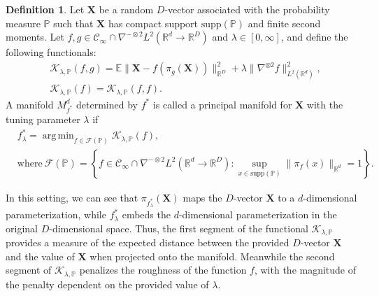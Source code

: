 \documentclass[11pt,reqno]{article}
\DeclareMathOperator*{\argmin}{arg\,min}
\theoremstyle{definition}
\newtheorem{definition}{Definition}
\begin{document}
\begin{definition}
  \label{def:principal_manifolds}
  Let $\boldsymbol{X}$ be a random $D$-vector associated with the probability measure $\mathbb{P}$ such that $\boldsymbol{X}$ has compact support $\text{supp}(\mathbb{P})$ and finite second moments. Let $f, g \in \mathcal{C}_{\infty}\cap \nabla^{-\otimes 2}L^2(\mathbb{R}^{d} \to \mathbb{R}^{D})$ and $\lambda \in [0, \infty]$, and define the following functionals:
  \begin{align}\label{eq:5}
&\mathcal{K}_{\lambda, \mathbb{P}}(f, g) = \mathbb{E}\|\boldsymbol{X} - f(\pi_g(\boldsymbol{X}))\|_{\mathbb{R}^{D}}^2 + \lambda\|\nabla^{\otimes 2}f\|_{L^2(\mathbb{R}^{d})}^2, \\
&\mathcal{K}_{\lambda, \mathbb{P}}(f) = \mathcal{K}_{\lambda, \mathbb{P}}(f, f). \nonumber
  \end{align}
  A manifold $M_{f^{*}}^{d}$ determined by $f^{*}$ is called a principal manifold for $\boldsymbol{X}$ with the tuning parameter $\lambda$ if 
  \begin{equation}\label{eq:7}
    \begin{aligned}
        & f_{\lambda}^{*} = \argmin_{f \in \mathcal{F}(\mathbb{P})}\mathcal{K}_{\lambda, \mathbb{P}}(f), \\ 
    &\text{where} \ \mathcal{F}(\mathbb{P}) = \left\{f \in \mathcal{C}_{\infty} \cap \nabla^{-\otimes 2}L^2(\mathbb{R}^{d} \to \mathbb{R}^{D}): \sup_{x \in \text{supp}(\mathbb{P})}\|\pi_f(x)\|_{\mathbb{R}^{d}} = 1\right\}. 
    \end{aligned}
  \end{equation}
\end{definition}
In this setting, we can see that $\pi_{f_{\lambda}^{*}}(\boldsymbol{X})$ maps the $D$-vector $\boldsymbol{X}$ to a $d$-dimensional parameterization, while $f_{\lambda}^{*}$ embeds the $d$-dimensional parameterization in the original $D$-dimensional space. Thus, the first segment of the functional $\mathcal{K}_{\lambda, \mathbb{P}}$ provides a measure of the expected distance between the provided $D$-vector $\mathbf{X}$ and the value of $\mathbf{X}$ when projected onto the manifold. Meanwhile the second segment of $\mathcal{K}_{\lambda, \mathbb{P}}$ penalizes the roughness of the function $f$, with the magnitude of the penalty dependent on the provided value of $\lambda$.
\end{document}
